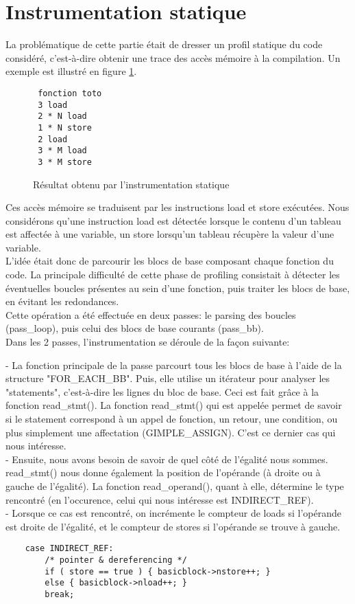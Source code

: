 \section{Instrumentation statique}

La problématique de cette partie était de dresser un profil statique du code considéré, c'est-à-dire obtenir une trace des accès mémoire à la compilation. Un exemple est illustré en figure \ref{fig:static_result}.

\begin{figure}[here]
  \centering
\begin{verbatim}
 fonction toto
 3 load
 2 * N load
 1 * N store
 2 load
 3 * M load
 3 * M store
\end{verbatim}
  \caption{Résultat obtenu par l'instrumentation statique}
  \label{fig:static_result}
\end{figure}

 Ces accès mémoire se traduisent par les instructions load et store exécutées. Nous considérons qu'une instruction load est détectée lorsque le contenu d'un tableau est affectée à une variable, un store lorsqu'un tableau récupère la valeur d'une variable.\\

L'idée était donc de parcourir les blocs de base composant chaque fonction du code. La principale difficulté de cette phase de profiling consistait à détecter les éventuelles boucles présentes au sein d'une fonction, puis traiter les blocs de base, en évitant les redondances.\\

Cette opération a été effectuée en deux passes: le parsing des boucles (pass\_loop), puis celui des blocs de base courants (pass\_bb).\\

Dans les 2 passes, l'instrumentation se déroule de la façon suivante:

- La fonction principale de la passe parcourt tous les blocs de base à l'aide de la structure "FOR\_EACH\_BB". Puis, elle utilise un itérateur pour analyser les "statements", c'est-à-dire les lignes du bloc de base. Ceci est fait grâce à la fonction read\_stmt().
La fonction read\_stmt() qui est appelée permet de savoir si le statement correspond à un appel de fonction, un retour, une condition, ou plus simplement une affectation (GIMPLE\_ASSIGN). C'est ce dernier cas qui nous intéresse.\\
- Ensuite, nous avons besoin de savoir de quel côté de l'égalité nous sommes. read\_stmt() nous donne également la position de l'opérande (à droite ou à gauche de l'égalité). La fonction read\_operand(), quant à elle, détermine le type rencontré (en l'occurence, celui qui nous intéresse est INDIRECT\_REF).\\
- Lorsque ce cas est rencontré, on incrémente le compteur de loads si l'opérande est droite de l'égalité, et le compteur de stores si l'opérande se trouve à gauche.\\
\begin{verbatim}
	case INDIRECT_REF:
	    /* pointer & dereferencing */
	    if ( store == true ) { basicblock->nstore++; }
	    else { basicblock->nload++; }
	    break;
\end{verbatim}

